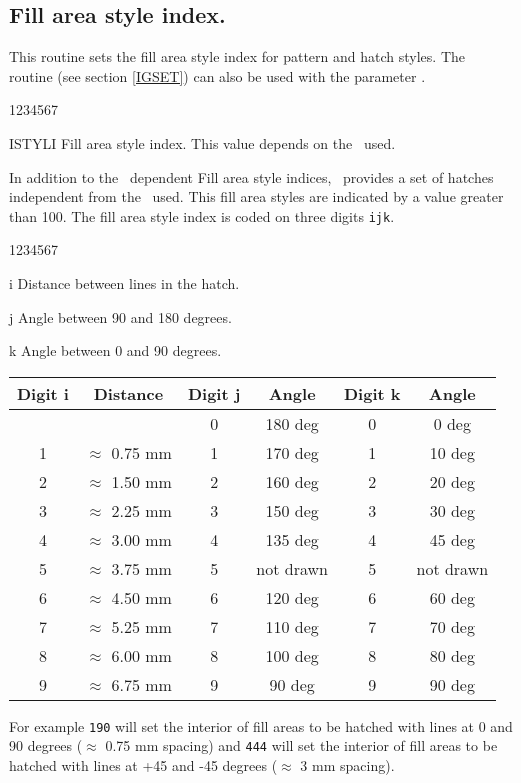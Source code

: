 \subsection{Fill area style index.}
\Action
This routine sets the fill area style index for pattern and hatch styles. The
routine  (see section \ref{IGSET}) can also be used with the
parameter .
\Pdesc
\begin{DLtt}{1234567}
\item[ISTYLI] Fill area style index. This value depends on the \UGP~used.
\end{DLtt}
In addition to the \UGP~dependent Fill area style indices, \HIGZ~provides a set
of hatches independent from the \UGP~used. This fill area styles are indicated
by a value greater than 100. The fill area style index is coded on three digits
{\tt ijk}.
\begin{DLtt}{1234567}
\item[i] Distance between lines in the hatch.
\item[j] Angle between 90 and 180 degrees.
\item[k] Angle between  0 and  90 degrees.
\end{DLtt}
\begin{center}
\begin{tabular}{||c|c||c|c||c|c||}
\hline
Digit i  &      Distance      &  Digit j  &  Angle  &   Digit k  &  Angle  \\
\hline
         &                    &     0     & 180 deg &     0      &   0 deg \\
  1      & $\approx$ 0.75 mm  &     1     & 170 deg &     1      &  10 deg \\
  2      & $\approx$ 1.50 mm  &     2     & 160 deg &     2      &  20 deg \\
  3      & $\approx$ 2.25 mm  &     3     & 150 deg &     3      &  30 deg \\
  4      & $\approx$ 3.00 mm  &     4     & 135 deg &     4      &  45 deg \\
  5      & $\approx$ 3.75 mm  &     5     &not drawn&     5      &not drawn\\
  6      & $\approx$ 4.50 mm  &     6     & 120 deg &     6      &  60 deg \\
  7      & $\approx$ 5.25 mm  &     7     & 110 deg &     7      &  70 deg \\
  8      & $\approx$ 6.00 mm  &     8     & 100 deg &     8      &  80 deg \\
  9      & $\approx$ 6.75 mm  &     9     &  90 deg &     9      &  90 deg \\
\hline
\end{tabular}
\end{center}
For example {\tt 190} will set the interior of fill areas to be hatched with
lines at 0 and 90 degrees ($\approx$ 0.75 mm spacing) and {\tt 444} will set
the interior of fill areas to be hatched with lines at +45 and -45 degrees
($\approx$ 3 mm spacing).

